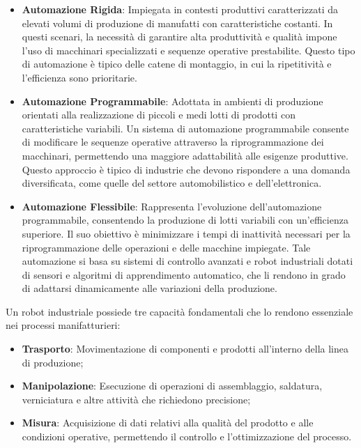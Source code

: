 \documentclass[11pt, a4paper]{report}
\begin{document}
\begin{itemize}
    \item \textbf{Automazione Rigida}: Impiegata in contesti produttivi caratterizzati da elevati volumi di produzione di manufatti con caratteristiche costanti. In questi scenari, la necessità di garantire alta produttività e qualità impone l'uso di macchinari specializzati e sequenze operative prestabilite. Questo tipo di automazione è tipico delle catene di montaggio, in cui la ripetitività e l'efficienza sono prioritarie.
    \item \textbf{Automazione Programmabile}: Adottata in ambienti di produzione orientati alla realizzazione di piccoli e medi lotti di prodotti con caratteristiche variabili. Un sistema di automazione programmabile consente di modificare le sequenze operative attraverso la riprogrammazione dei macchinari, permettendo una maggiore adattabilità alle esigenze produttive. Questo approccio è tipico di industrie che devono rispondere a una domanda diversificata, come quelle del settore automobilistico e dell'elettronica.
    \item \textbf{Automazione Flessibile}: Rappresenta l'evoluzione dell'automazione programmabile, consentendo la produzione di lotti variabili con un'efficienza superiore. Il suo obiettivo è minimizzare i tempi di inattività necessari per la riprogrammazione delle operazioni e delle macchine impiegate. Tale automazione si basa su sistemi di controllo avanzati e robot industriali dotati di sensori e algoritmi di apprendimento automatico, che li rendono in grado di adattarsi dinamicamente alle variazioni della produzione.
\end{itemize}

Un robot industriale possiede tre capacità fondamentali che lo rendono essenziale nei processi manifatturieri:

\begin{itemize}
    \item \textbf{Trasporto}: Movimentazione di componenti e prodotti all'interno della
    linea di produzione;
    \item \textbf{Manipolazione}: Esecuzione di operazioni di assemblaggio, saldatura, verniciatura e altre attività che richiedono precisione;
    \item \textbf{Misura}: Acquisizione di dati relativi alla qualità del prodotto e alle condizioni operative, permettendo il controllo e l'ottimizzazione del processo.
\end{itemize}
\newpage
\end{document}
